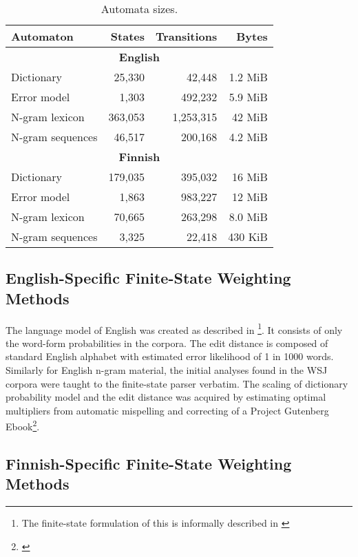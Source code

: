 \documentclass{llncs}
\begin{document}
\begin{table}
\caption{Automata sizes\label{table:sizes}.}
\begin{centering}
\begin{scriptsize}
\begin{tabular}{lrrr}
    Automaton & States & Transitions & Bytes \\
    \hline
    \multicolumn{4}{c}{\textbf{English}} \\
    \hline
    Dictionary & 25,330 & 42,448 & 1.2 MiB \\
    Error model & 1,303 & 492,232 & 5.9 MiB \\
    N-gram lexicon & 363,053 & 1,253,315 & 42 MiB \\
    N-gram sequences & 46,517 & 200,168 & 4.2 MiB \\
    \hline
    \multicolumn{4}{c}{\textbf{Finnish}} \\
    \hline
    Dictionary & 179,035 & 395,032 & 16 MiB \\
    Error model & 1,863 & 983,227 & 12 MiB \\
    N-gram lexicon & 70,665 & 263,298 & 8.0 MiB \\
    N-gram sequences & 3,325 & 22,418 & 430 KiB \\
    \hline
\end{tabular}
\end{scriptsize}
\end{centering}
\end{table}

\subsection{English-Specific Finite-State Weighting Methods}

The language model of English was created as described in
\cite{norvig/2010}\footnote{The finite-state formulation of this is informally
described in \url{}}.  It consists of only the word-form probabilities in the
corpora. The edit distance is composed of standard English alphabet with
estimated error likelihood of 1 in 1000 words.  Similarly for English n-gram
material, the initial analyses found in the WSJ corpora were taught to the
finite-state parser verbatim. The scaling of dictionary probability model and
the edit distance was acquired by estimating optimal multipliers from automatic
mispelling and correcting of a Project Gutenberg Ebook\footnote{\url{}}.

\subsection{Finnish-Specific Finite-State Weighting Methods}
\end{document}

